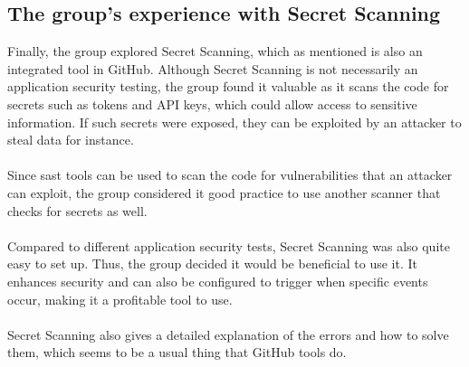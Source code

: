 \subsection{The group's experience with Secret Scanning}
Finally, the group explored Secret Scanning, which as mentioned is also an integrated tool in GitHub. Although Secret Scanning is not necessarily an application security testing, the group found it valuable as it scans the code for secrets such as tokens and API keys, which could allow access to sensitive information. If such secrets were exposed, they can be exploited by an attacker to steal data for instance. 
\\~\\
Since \acrshort{sast} tools can be used to scan the code for vulnerabilities that an attacker can exploit, the group considered it good practice to use another scanner that checks for secrets as well. 
\\~\\
Compared to different application security tests, Secret Scanning was also quite easy to set up. Thus, the group decided it would be beneficial to use it. It enhances security and can also be configured to trigger when specific events occur, making it a profitable tool to use. 
\\~\\
Secret Scanning also gives a detailed explanation of the errors and how to solve them, which seems to be a usual thing that GitHub tools do. 

